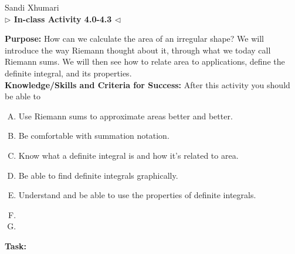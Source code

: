 \documentclass[answers]{exam}
\begin{document}
	
	
	
	
	\begin{center}
		\hfill Sandi Xhumari \\ \textbf{$\triangleright$ In-class Activity 4.0-4.3 $\triangleleft$}\\
	\end{center}

\textbf{Purpose:} How can we calculate the area of an irregular shape? We will introduce the way Riemann thought about it, through what we today call Riemann sums. We will then see how to relate area to applications, define the definite integral, and its properties.    \\

\textbf{Knowledge/Skills and Criteria for Success:} After this activity you should be able to

\begin{enumerate}[A.]
	\item Use Riemann sums to approximate areas better and better.
	\item Be comfortable with summation notation.
	\item Know what a definite integral is and how it's related to area.
	\item Be able to find definite integrals graphically.
	\item Understand and be able to use the properties of definite integrals. 
	\\
	\item 
	\item 
	
\end{enumerate}

\textbf{Task:}
	
	
	
\end{document}
